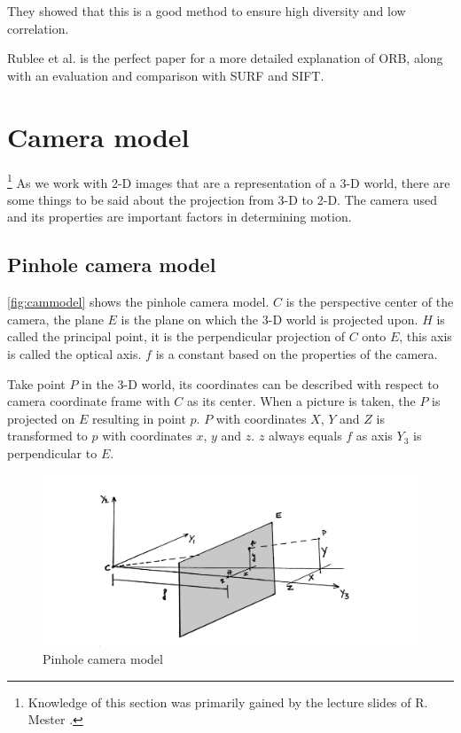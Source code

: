 They showed that this is a good method to ensure high diversity and low correlation.\bigskip

Rublee et al.\cite{6126544} is the perfect paper for a more detailed explanation of ORB, along with an evaluation and comparison with SURF and SIFT. 


\section{Camera model}\footnote{Knowledge of this section was primarily gained by the lecture slides of R. Mester \cite{computer_vision}.}
As we work with 2-D images that are a representation of a 3-D world, there are some things to be said about the projection from 3-D to 2-D. The camera used and its properties are important factors in determining motion.

\subsection{Pinhole camera model}
\autoref{fig:cammodel} shows the pinhole camera model. $C$ is the perspective center of the camera, the plane $E$ is the plane on which the 3-D world is projected upon. $H$ is called the principal point, it is the perpendicular projection of $C$ onto $E$, this axis is called the optical axis. $f$ is a constant based on the properties of the camera.\bigskip

Take point $P$ in the 3-D world, its coordinates can be described with respect to camera coordinate frame with $C$ as its center. When a picture is taken, the $P$ is projected on $E$ resulting in point $p$. $P$ with coordinates $X$, $Y$ and $Z$ is transformed to $p$ with coordinates $x$, $y$ and $z$. $z$ always equals $f$ as axis $Y_3$ is perpendicular to $E$.\bigskip

\begin{figure}
    \centering
    \includegraphics[width=1\textwidth]{figures/camera_model.jpg}
    \caption{Pinhole camera model}
    \label{fig:cammodel}
\end{figure}

